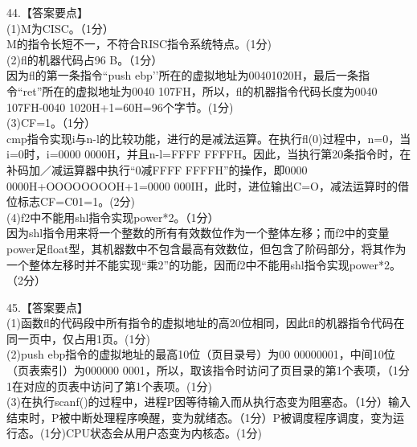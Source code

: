44.【答案要点】 \\
(1)M为CISC。（1分） \\
M的指令长短不一，不符合RISC指令系统特点。(1分) \\
(2)fl的机器代码占96 B。（1分） \\
因为fl的第一条指令“push ebp'’所在的虚拟地址为00401020H，最后一条指令“ret”所在的虚拟地址为0040 107FH，所以，fl的机器指令代码长度为0040 107FH-0040 1020H+1=60H=96个字节。(1分) \\
(3)CF=1。（1分） \\
cmp指令实现i与n-l的比较功能，进行的是减法运算。在执行fl(0)过程中，n=0，当i=0时，i=0000 0000H，并且n-l=FFFF FFFFH。因此，当执行第20条指令时，在补码加／减运算器中执行“0减FFFF FFFFH”的操作，即0000 0000H+OOOOOOOOH+1=0000 000IH，此时，进位输出C=O，减法运算时的借位标志CF=C01=1。(2分) \\
(4)f2中不能用shl指令实现power*2。（1分） \\
因为shl指令用来将一个整数的所有有效数位作为一个整体左移；而f2中的变量power足float型，其机器数中不包含最高有效数位，但包含了阶码部分，将其作为一个整体左移时并不能实现“乘2”的功能，因而f2中不能用shl指令实现power*2。（2分）

45.【答案要点】 \\
(1)函数fl的代码段中所有指令的虚拟地址的高20位相同，因此fl的机器指令代码在同一页中，仅占用1页。(1分) \\
(2)push ebp指令的虚拟地址的最高10位（页目录号）为00 00000001，中间10位（页表索引）为000000 0001，所以，取该指令时访问了页目录的第1个表项，（1分1在对应的页表中访问了第1个表项。(1分) \\
(3)在执行scanf()的过程中，进程P因等待输入而从执行态变为阻塞态。（1分）输入结束时，P被中断处理程序唤醒，变为就绪态。（1分）P被调度程序调度，变为运行态。(1分)CPU状态会从用户态变为内核态。(1分)

